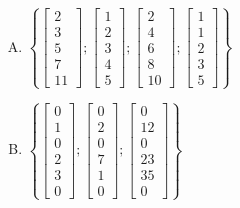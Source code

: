 \begin{enumerate}[A.]
\item
$\left\{\left[ \begin{array}{c} 2 \\ 3 \\ 5 \\ 7 \\ 11 \end{array} \right] ;
\left[ \begin{array}{c} 1 \\ 2 \\ 3 \\ 4 \\5 \end{array} \right] ;
\left[ \begin{array}{c} 2 \\ 4 \\ 6 \\ 8 \\ 10 \end{array} \right] ; 
\left[ \begin{array}{c} 1 \\ 1 \\ 2 \\ 3 \\ 5 \end{array} \right] \right\} $

\item
$\left\{\left[ \begin{array}{c} 0 \\ 1 \\ 0\\ 2 \\ 3 \\ 0 \end{array} \right] ;
\left[ \begin{array}{c} 0 \\ 2 \\ 0\\ 7 \\ 1 \\ 0 \end{array} \right] ;
\left[ \begin{array}{c} 0 \\ 12 \\ 0\\ 23 \\ 35 \\ 0 \end{array} \right] \right\}$



\end{enumerate}
